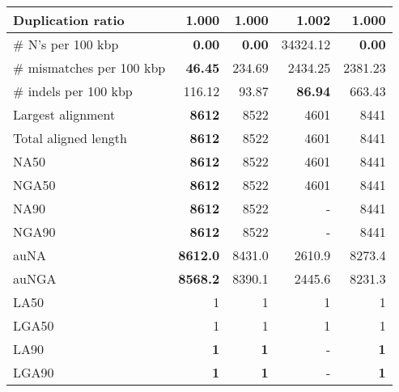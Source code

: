 \documentclass[12pt,a4paper]{article}
\begin{document}
\begin{table}[ht]
\begin{center}
\begin{tabular}{|l*{4}{|r}|}
Duplication ratio & {\bf 1.000} & {\bf 1.000} & 1.002 & {\bf 1.000} \\ \hline
\# N's per 100 kbp & {\bf 0.00} & {\bf 0.00} & 34324.12 & {\bf 0.00} \\ \hline
\# mismatches per 100 kbp & {\bf 46.45} & 234.69 & 2434.25 & 2381.23 \\ \hline
\# indels per 100 kbp & 116.12 & 93.87 & {\bf 86.94} & 663.43 \\ \hline
Largest alignment & {\bf 8612} & 8522 & 4601 & 8441 \\ \hline
Total aligned length & {\bf 8612} & 8522 & 4601 & 8441 \\ \hline
NA50 & {\bf 8612} & 8522 & 4601 & 8441 \\ \hline
NGA50 & {\bf 8612} & 8522 & 4601 & 8441 \\ \hline
NA90 & {\bf 8612} & 8522 & - & 8441 \\ \hline
NGA90 & {\bf 8612} & 8522 & - & 8441 \\ \hline
auNA & {\bf 8612.0} & 8431.0 & 2610.9 & 8273.4 \\ \hline
auNGA & {\bf 8568.2} & 8390.1 & 2445.6 & 8231.3 \\ \hline
LA50 & 1 & 1 & 1 & 1 \\ \hline
LGA50 & 1 & 1 & 1 & 1 \\ \hline
LA90 & {\bf 1} & {\bf 1} & - & {\bf 1} \\ \hline
LGA90 & {\bf 1} & {\bf 1} & - & {\bf 1} \\ \hline
\end{tabular}
\end{center}
\end{table}
\end{document}
